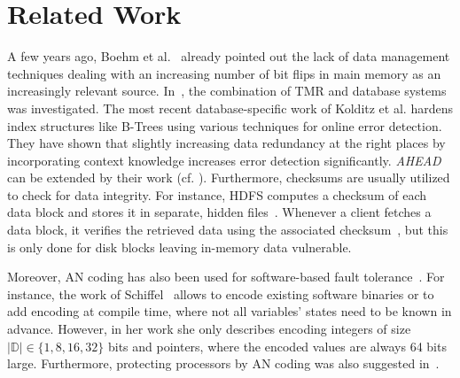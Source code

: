 

\section{Related Work}
\label{sec:RelatedWork}

A few years ago, Boehm et al.~\cite{DBLP:journals/pvldb/BohmLF11} already pointed out the lack of data management techniques dealing with an increasing number of bit flips in main memory as an increasingly relevant source. In~\cite{DBLP:conf/srds/PittelliG86,DBLP:journals/tocs/PittelliG89}, the combination of TMR and database systems was investigated. The most recent database-specific work of Kolditz et al. \cite{DBLP:conf/damon/KolditzKSHL14} hardens index structures like B-Trees using various techniques for online error detection. They have shown that slightly increasing data redundancy at the right places by incorporating context knowledge increases error detection significantly. \emph{AHEAD} can be extended by their work (cf. ). Furthermore, checksums are usually utilized to check for data integrity. For instance, HDFS computes a checksum of each data block and stores it in separate, hidden files~\cite{DBLP:conf/mss/ShvachkoKRC10}. Whenever a client fetches a data block, it verifies the retrieved data using the associated checksum~\cite{DBLP:conf/mss/ShvachkoKRC10}, but this is only done for disk blocks leaving in-memory data vulnerable. %

Moreover, AN coding has also been used for software-based fault tolerance~\cite{DBLP:conf/hase/HoffmannUDSLS14,DBLP:phd/de/Schiffel2011,ulbrich2012eliminating}. For instance, the work of Schiffel~\cite{DBLP:phd/de/Schiffel2011} allows to encode existing software binaries or to add encoding at compile time, where not all variables' states need to be known in advance. However, in her work she only describes encoding integers of size \(|\mathbb{D}|\in\{1, 8, 16, 32\}\) bits and pointers, where the encoded values are always 64 bits large. Furthermore, protecting processors by AN coding was also suggested in~\cite{forin1989vital}.

